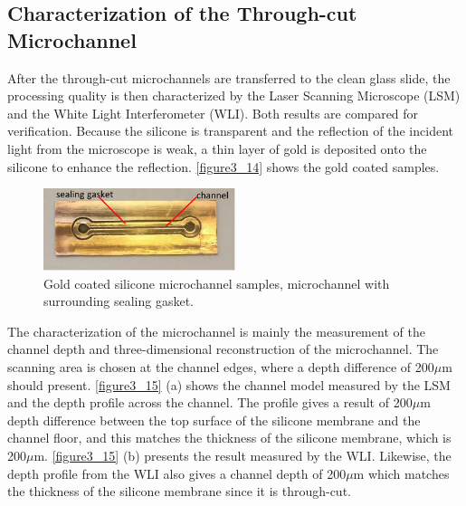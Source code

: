\subsection{Characterization of the Through-cut Microchannel}
\label{3_4_3}
After the through-cut microchannels are transferred to the clean glass slide, the processing quality is then characterized by the Laser Scanning Microscope (LSM) and the White Light Interferometer (WLI). Both results are compared for verification. Because the silicone is transparent and the reflection of the incident light from the microscope is weak, a thin layer of gold is deposited onto the silicone to enhance the reflection. \autoref{figure3_14} shows the gold coated samples.\\

\begin{figure}[h]%
\centering
\includegraphics[width=0.5\textwidth]{figures/designandfabrication/figure3_14}%
\caption{Gold coated silicone microchannel samples, microchannel with surrounding sealing gasket.}%
\label{figure3_14}%
\end{figure}

The characterization of the microchannel is mainly the measurement of the channel depth and three-dimensional reconstruction of the microchannel. The scanning area is chosen at the channel edges, where a depth difference of 200$\mu$m should present. \autoref{figure3_15} (a) shows the channel model measured by the LSM and the depth profile across the channel. The profile gives a result of 200$\mu$m depth difference between the top surface of the silicone membrane and the channel floor, and this matches the thickness of the silicone membrane, which is 200$\mu$m. \autoref{figure3_15} (b) presents the result measured by the WLI. Likewise, the depth profile from the WLI also gives a channel depth of 200$\mu$m which matches the thickness of the silicone membrane since it is through-cut.

